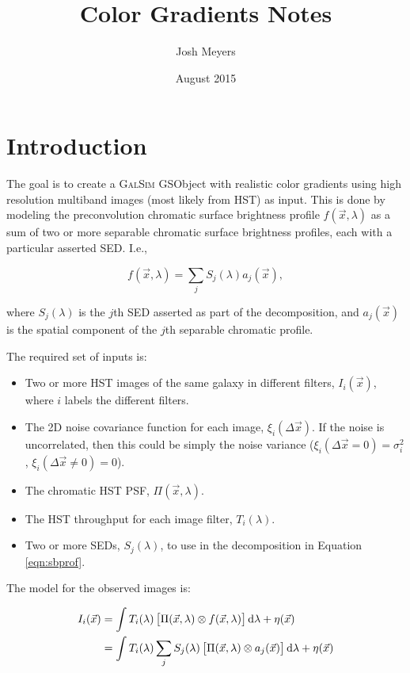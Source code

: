 \documentclass{article}
\title{Color Gradients Notes}
\author{Josh Meyers}
\date{August 2015}
\begin{document}
\section{Introduction}

The goal is to create a \textsc{GalSim} GSObject with realistic color gradients using high
resolution multiband images (most likely from HST) as input.  This is done by modeling the
preconvolution chromatic surface brightness profile $f(\vec{x}, \lambda)$ as a sum of two or more
separable chromatic surface brightness profiles, each with a particular asserted SED.  I.e.,

\begin{equation}
    \label{eqn:sbprof}
    f(\vec{x}, \lambda) = \sum_j S_j(\lambda) a_j(\vec{x}),
\end{equation}

where $S_j(\lambda)$ is the $j$th SED asserted as part of the decomposition, and $a_j(\vec{x})$ is
the spatial component of the $j$th separable chromatic profile.

The required set of inputs is:

\begin{itemize}

\item Two or more HST images of the same galaxy in different filters, $I_i(\vec{x})$, where $i$
labels the different filters.

\item The 2D noise covariance function for each image, $\xi_i(\Delta\vec{x})$.  If the noise is
uncorrelated, then this could be simply the noise variance ($\xi_i(\Delta\vec{x}=0) = \sigma^2_i$, $\xi_i(\Delta\vec{x}\ne0)=0$).

\item The chromatic HST PSF, $\Pi(\vec{x}, \lambda)$.

\item The HST throughput for each image filter, $T_i(\lambda)$.

\item Two or more SEDs, $S_j(\lambda)$, to use in the decomposition in Equation \ref{eqn:sbprof}.

\end{itemize}

The model for the observed images is:

\begin{align}
    I_i(\vec{x})
    &= \int T_i(\lambda) \left[\Pi(\vec{x}, \lambda) \otimes f(\vec{x}, \lambda)\right] \dif{\lambda} + \eta(\vec{x}) \\
    &= \int T_i(\lambda) \sum_j S_j(\lambda) \left[\Pi(\vec{x}, \lambda) \otimes a_j(\vec{x})\right] \dif{\lambda} + \eta(\vec{x})
\end{align}
\end{document}
